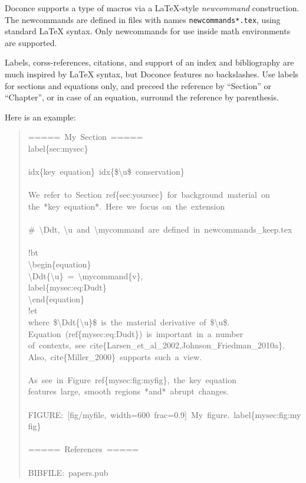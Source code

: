 \documentclass[a4paper]{article}
\begin{document}
Doconce supports a type of macros via a LaTeX-style \emph{newcommand}
construction.  The newcommands are defined in files with names
\texttt{newcommands*.tex}, using standard LaTeX syntax. Only newcommands
for use inside math environments are supported.

Labels, corss-references, citations, and support of an index and
bibliography are much inspired by LaTeX syntax, but Doconce features
no backslashes. Use labels for sections and equations only, and
preceed the reference by ``Section'' or ``Chapter'', or in case of
an equation, surround the reference by parenthesis.

Here is an example:
%
\begin{quote}{\ttfamily \raggedright \noindent
=====~My~Section~=====\\
label\{sec:mysec\}\\
~\\
idx\{key~equation\}~idx\{\$\textbackslash{}u\$~conservation\}\\
~\\
We~refer~to~Section~ref\{sec:yoursec\}~for~background~material~on\\
the~*key~equation*.~Here~we~focus~on~the~extension\\
~\\
\#~\textbackslash{}Ddt,~\textbackslash{}u~and~\textbackslash{}mycommand~are~defined~in~newcommands\_keep.tex\\
~\\
!bt\\
\textbackslash{}begin\{equation\}\\
\textbackslash{}Ddt\{\textbackslash{}u\}~=~\textbackslash{}mycommand\{v\},\\
label\{mysec:eq:Dudt\}\\
\textbackslash{}end\{equation\}\\
!et\\
where~\$\textbackslash{}Ddt\{\textbackslash{}u\}\$~is~the~material~derivative~of~\$\textbackslash{}u\$.\\
Equation~(ref\{mysec:eq:Dudt\})~is~important~in~a~number\\
of~contexts,~see~cite\{Larsen\_et\_al\_2002,Johnson\_Friedman\_2010a\}.\\
Also,~cite\{Miller\_2000\}~supports~such~a~view.\\
~\\
As~see~in~Figure~ref\{mysec:fig:myfig\},~the~key~equation\\
features~large,~smooth~regions~*and*~abrupt~changes.\\
~\\
FIGURE:~{[}fig/myfile,~width=600~frac=0.9{]}~My~figure.~label\{mysec:fig:myfig\}\\
~\\
=====~References~=====\\
~\\
BIBFILE:~papers.pub
}
\end{quote}
\end{document}
